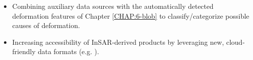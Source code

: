 \begin{itemize}
\item Combining auxiliary data sources with the automatically detected deformation features of Chapter \ref{CHAP:6-blob} to classify/categorize possible causes of deformation.

\item Increasing accessibility of InSAR-derived products by leveraging new, cloud-friendly data formats (e.g. \cite{Kellndorfer2022GlobalSeasonalSentinel}).


\end{itemize}

